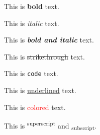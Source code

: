 \documentclass{article}
\begin{document}
This is \textbf{bold} text.

This is \textit{italic} text.

This is \textbf{\textit{bold and italic}} text.

This is \st{strikethrough} text.

This is \texttt{code} text.

This is \underline{underlined} text.

This is \textcolor{red}{colored} text.

This is \textsuperscript{superscript} and \textsubscript{subscript}.
\end{document}
